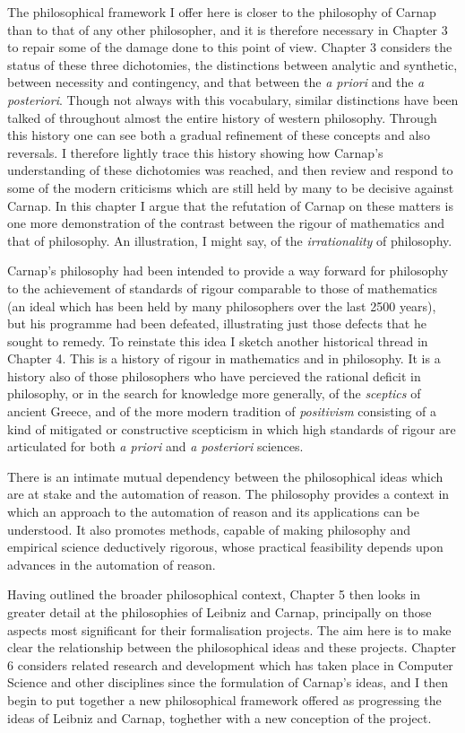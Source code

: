 The philosophical framework I offer here is closer to the philosophy of Carnap than to that of any other philosopher, and it is therefore necessary in Chapter 3 to repair some of the damage done to this point of view.
Chapter 3 considers the status of these three dichotomies, the distinctions between analytic and synthetic, between necessity and contingency, and that between the \emph{a priori} and the \emph{a posteriori}.
Though not always with this vocabulary, similar distinctions have been talked of throughout almost the entire history of western philosophy.
Through this history one can see both a gradual refinement of these concepts and also reversals.
I therefore lightly trace this history showing how Carnap's understanding of these dichotomies was reached, and then review and respond to some of the modern criticisms which are still held by many to be decisive against Carnap.
In this chapter I argue that the refutation of Carnap on these matters is one more demonstration of the contrast between the rigour of mathematics and that of philosophy.
An illustration, I might say, of the \emph{irrationality} of philosophy.

Carnap's philosophy had been intended to provide a way forward for philosophy to the achievement of standards of rigour comparable to those of mathematics (an ideal which has been held by many philosophers over the last 2500 years), but his programme had been defeated, illustrating  just those defects that he sought to remedy.
To reinstate this idea I sketch another historical thread in Chapter 4.
This is a history of rigour in mathematics and in philosophy.
It is a history also of those philosophers who have percieved the rational deficit in philosophy, or in the search for knowledge more generally, of the \emph{sceptics} of ancient Greece, and of the more modern tradition of \emph{positivism} consisting of a kind of mitigated or constructive scepticism in which high standards of rigour are articulated for both \emph{a priori} and \emph{a posteriori} sciences.

There is an intimate mutual dependency between the philosophical ideas which are at stake and the automation of reason.
The philosophy provides a context in which an approach to the automation of reason and its applications can be understood.
It also promotes methods, capable of making philosophy and empirical science deductively rigorous, whose practical feasibility depends upon advances in the automation of reason.

Having outlined the broader philosophical context, Chapter 5 then looks in greater detail at the philosophies of Leibniz and Carnap, principally on those aspects most significant for their formalisation projects.
The aim here is to make clear the relationship between the philosophical ideas and these projects.
Chapter 6 considers related research and development which has taken place in Computer Science and other disciplines since the formulation of Carnap's ideas, and I then begin to put together a new philosophical framework offered as progressing the ideas of Leibniz and Carnap, toghether with a new conception of the project.

